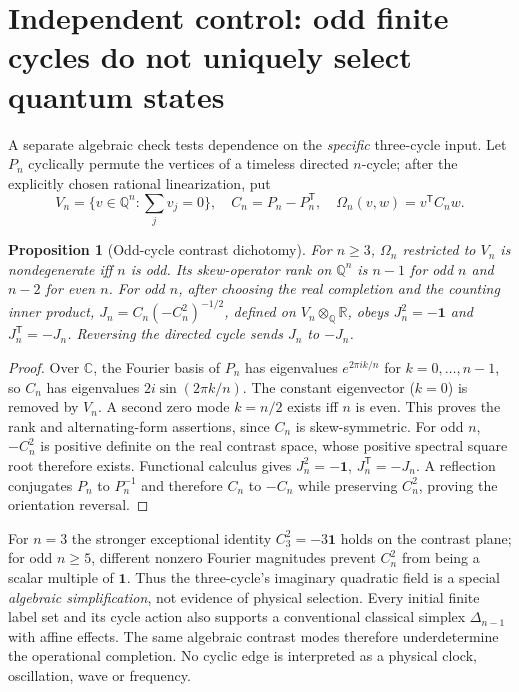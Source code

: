 \documentclass[10pt,letterpaper]{article}
\newtheorem{proposition}[theorem]{Proposition}
\newcommand{\C}{\mathbb C}
\newcommand{\R}{\mathbb R}
\newcommand{\Q}{\mathbb Q}
\newcommand{\I}{\mathbf 1}
\begin{document}
\section{Independent control: odd finite cycles do not uniquely select quantum states}
A separate algebraic check tests dependence on the \emph{specific} three-cycle input. Let $P_n$ cyclically permute the vertices of a timeless directed $n$-cycle; after the explicitly chosen rational linearization, put
\[
V_n=\{v\in\Q^n:\sum_jv_j=0\},\quad C_n=P_n-P_n^{\mathsf T},\quad \Omega_n(v,w)=v^{\mathsf T}C_n w.
\]
\begin{proposition}[Odd-cycle contrast dichotomy]\label{prop:cycles}
For $n\ge3$, $\Omega_n$ restricted to $V_n$ is nondegenerate iff $n$ is odd. Its skew-operator rank on $\Q^n$ is $n-1$ for odd $n$ and $n-2$ for even $n$. For odd $n$, after choosing the real completion and the counting inner product, $J_n=C_n(-C_n^2)^{-1/2}$, defined on $V_n\otimes_\Q\R$, obeys $J_n^2=-\I$ and $J_n^{\mathsf T}=-J_n$. Reversing the directed cycle sends $J_n$ to $-J_n$.
\end{proposition}
\begin{proof}
Over $\C$, the Fourier basis of $P_n$ has eigenvalues $e^{2\pi i k/n}$ for $k=0,\ldots,n-1$, so $C_n$ has eigenvalues $2i\sin(2\pi k/n)$. The constant eigenvector ($k=0$) is removed by $V_n$. A second zero mode $k=n/2$ exists iff $n$ is even. This proves the rank and alternating-form assertions, since $C_n$ is skew-symmetric. For odd $n$, $-C_n^2$ is positive definite on the real contrast space, whose positive spectral square root therefore exists. Functional calculus gives $J_n^2=-\I$, $J_n^{\mathsf T}=-J_n$. A reflection conjugates $P_n$ to $P_n^{-1}$ and therefore $C_n$ to $-C_n$ while preserving $C_n^2$, proving the orientation reversal.\end{proof}

For $n=3$ the stronger exceptional identity $C_3^2=-3\I$ holds on the contrast plane; for odd $n\ge5$, different nonzero Fourier magnitudes prevent $C_n^2$ from being a scalar multiple of $\I$. Thus the three-cycle's imaginary quadratic field is a special \emph{algebraic simplification}, not evidence of physical selection. Every initial finite label set and its cycle action also supports a conventional classical simplex $\Delta_{n-1}$ with affine effects. The same algebraic contrast modes therefore underdetermine the operational completion. No cyclic edge is interpreted as a physical clock, oscillation, wave or frequency.
\end{document}
